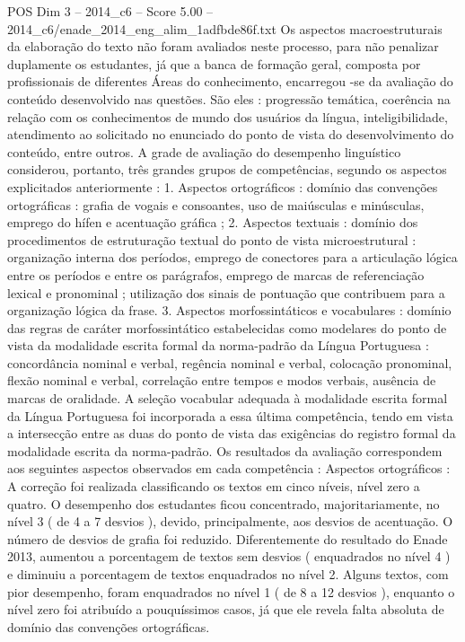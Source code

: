 \begin{textsample}{POS Dim 3 – 2014\_c6 – Score 5.00 – 2014\_c6/enade\_2014\_eng\_alim\_1adfbde86f.txt}
Os aspectos macroestruturais da elaboração do texto não foram avaliados neste processo, para não penalizar duplamente os estudantes, já que a banca de formação geral, composta por profissionais de diferentes Áreas do conhecimento, encarregou -se da avaliação do conteúdo desenvolvido nas questões.
São eles : progressão temática, coerência na relação com os conhecimentos de mundo dos usuários da língua, inteligibilidade, atendimento ao solicitado no enunciado do ponto de vista do desenvolvimento do conteúdo, entre outros.
A grade de avaliação do desempenho linguístico considerou, portanto, três grandes grupos de competências, segundo os aspectos explicitados anteriormente : 1.
Aspectos ortográficos : domínio das convenções ortográficas : grafia de vogais e consoantes, uso de maiúsculas e minúsculas, emprego do hífen e acentuação gráfica ; 2.
Aspectos textuais : domínio dos procedimentos de estruturação textual do ponto de vista microestrutural : organização interna dos períodos, emprego de conectores para a articulação lógica entre os períodos e entre os parágrafos, emprego de marcas de referenciação lexical e pronominal ; utilização dos sinais de pontuação que contribuem para a organização lógica da frase. 3.
Aspectos morfossintáticos e vocabulares : domínio das regras de caráter morfossintático estabelecidas como modelares do ponto de vista da modalidade escrita formal da norma-padrão da Língua Portuguesa : concordância nominal e verbal, regência nominal e verbal, colocação pronominal, flexão nominal e verbal, correlação entre tempos e modos verbais, ausência de marcas de oralidade.
A seleção vocabular adequada à modalidade escrita formal da Língua Portuguesa foi incorporada a essa última competência, tendo em vista a intersecção entre as duas do ponto de vista das exigências do registro formal da modalidade escrita da norma-padrão.
Os resultados da avaliação correspondem aos seguintes aspectos observados em cada competência : Aspectos ortográficos : A correção foi realizada classificando os textos em cinco níveis, nível zero a quatro.
O desempenho dos estudantes ficou concentrado, majoritariamente, no nível 3 ( de 4 a 7 desvios ), devido, principalmente, aos desvios de acentuação.
O número de desvios de grafia foi reduzido.
Diferentemente do resultado do Enade 2013, aumentou a porcentagem de textos sem desvios ( enquadrados no nível 4 ) e diminuiu a porcentagem de textos enquadrados no nível 2.
Alguns textos, com pior desempenho, foram enquadrados no nível 1 ( de 8 a 12 desvios ), enquanto o nível zero foi atribuído a pouquíssimos casos, já que ele revela falta absoluta de domínio das convenções ortográficas.

\end{textsample}
